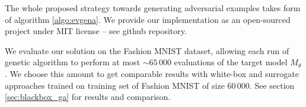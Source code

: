 The whole proposed strategy towards generating adversarial examples takes form of algorithm \ref{algo:evgena}. We provide our implementation as an open-sourced project under MIT license -- see \cite{git_evgena} github repository.

We evaluate our solution on the Fashion MNIST dataset, allowing each run of genetic algorithm to perform at most $\sim 65\,000$ evaluations of the target model $M_\theta$. We choose this amount to get comparable results with white-box and surrogate approaches trained on training set of Fashion MNIST of size $60\,000$. See section \ref{sec:blackbox_ga} for results and comparison.
